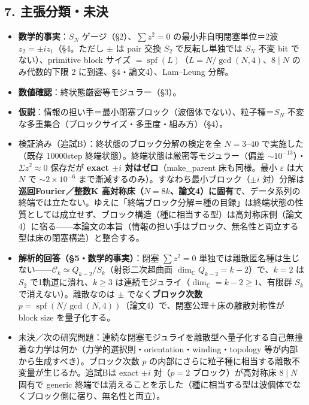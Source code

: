 \documentclass[
  a4paper,
]{ltjsarticle}
\providecommand{\tightlist}{%
  \setlength{\itemsep}{0pt}\setlength{\parskip}{0pt}}
\begin{document}
\subsection{7.
主張分類・未決}\label{ux4e3bux5f35ux5206ux985eux672aux6c7a}

\begin{itemize}
\tightlist
\item
  \textbf{数学的事実}：\(S_N\) ゲージ（§2）、\(\sum z^2=0\)
  の最小非自明閉塞単位＝2波 \(z_2=\pm i z_1\)（§4。ただし \(\pm\) は
  pair 交換 \(S_2\) で反転し単独では \(S_N\) 不変 bit
  でない）、primitive block サイズ
  \(=\operatorname{spf}(L)\)（\(L=N/\gcd(N,4)\)、\(8\mid N\)
  のみ代数的下限 2 に到達、§4・論文4）、Lam--Leung 分解。
\item
  \textbf{数値確認}：終状態厳密等モジュラー（§3）。
\item
  \textbf{仮説}：情報の担い手＝最小閉塞ブロック（波個体でない）、粒子種＝\(S_N\)
  不変な多重集合（ブロックサイズ・多重度・組み方）（§4）。
\item
  検証済み（追試B）：終状態のブロック分解の検定を全 \(N=3\)--\(40\)
  で実施した（既存 10000step
  終端状態）。終端状態は厳密等モジュラー（偏差
  \(\sim10^{-13}\)）・\(\Sigma z^2\approx0\) 保存だが \textbf{exact
  \(\pm i\) 対はゼロ}（make\_parent 床も同様。最小 \(\varepsilon\) は大
  \(N\) で \(\sim2\times10^{-6}\)
  まで漸減するのみ）。すなわち最小ブロック（\(\pm i\)
  対）分解は\textbf{巡回Fourier／整数K
  高対称床（\(N=8k\)、論文4）に固有}で、データ系列の終端では立たない。ゆえに「終端ブロック分解＝種の目録」は終端状態の性質としては成立せず、ブロック構造（種に相当する型）は高対称床側（論文4）に宿る------本論文の本旨（情報の担い手はブロック、無名性と両立する型は床の閉塞構造）と整合する。
\item
  \textbf{解析的回答（§5・数学的事実）}：閉塞 \(\sum z^2=0\)
  単独では離散匿名種は生じない------\(\mathcal C_k\simeq Q_{k-2}/S_k\)（射影二次超曲面
  \(\dim_{\mathbb C}Q_{k-2}=k-2\)）で、\(k=2\) は \(S_2\)
  で1軌道に潰れ、\(k\ge3\)
  は連続モジュライ（\(\dim_{\mathbb C}=k-2\ge1\)、有限群 \(S_k\)
  で消えない）。離散なのは \(\pm\) でなく\textbf{ブロック次数
  \(p=\operatorname{spf}(N/\gcd(N,4))\)}（論文4）で、閉塞公理＋床の離散対称性が
  block size を量子化する。
\item
  未決／次の研究問題：連続な閉塞モジュライを離散型へ量子化する自己無撞着な力学は何か（力学的選択則・orientation・winding・topology
  等が内部から生成すべき）。ブロック次数 \(p\)
  の内部にさらに粒子種に相当する離散不変量が生じるか。追試Bは exact
  \(\pm i\) 対（\(p=2\) ブロック）が高対称床 \(8\mid N\) 固有で generic
  終端では消えることを示した（種に相当する型は波個体でなくブロック側に宿り、無名性と両立）。
\end{itemize}
\end{document}
